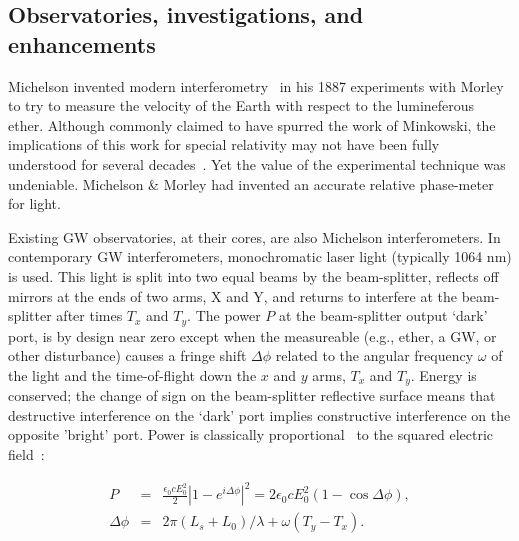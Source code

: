 
        \subsection{Observatories, investigations, and enhancements}
        \label{methods}


	Michelson invented modern interferometry~\cite{michelson} in his 1887 experiments with Morley to try to measure the velocity of the Earth with respect to the lumineferous ether.
Although commonly claimed to have spurred the work of Minkowski, the implications of this work for special relativity may not have been fully understood for several decades~\cite{CollinsGravityGhost}.
Yet the value of the experimental technique was undeniable.
Michelson \& Morley had invented an accurate relative phase-meter for light.

Existing GW observatories, at their cores, are also Michelson interferometers. 
In contemporary GW interferometers, monochromatic laser light (typically 1064 nm) is used.
This light is split into two equal beams by the beam-splitter, reflects off mirrors at the ends of two arms, X and Y, and returns to interfere at the beam-splitter after times $T_x$ and $T_y$.
The power $P$ at the beam-splitter output `dark' port, is by design near zero except when the measureable (e.g., ether, a GW, or other disturbance) causes a fringe shift $\Delta \phi$ related to the angular frequency $\omega$ of the light and the time-of-flight down the $x$ and $y$ arms, $T_x$ and $T_y$. 
Energy is conserved; the change of sign on the beam-splitter reflective surface means that destructive interference on the `dark' port implies constructive interference on the opposite 'bright' port.
Power is classically proportional~\cite{JacksonEM} to the squared electric field~\cite{Saulson}:

\begin{eqnarray}
P &=& \frac{\epsilon_0 c E_0^2}{2} \left| 1 - e^{i \Delta \phi}\right|^2 = 2 \epsilon_0 c E_0^2 (1 - \cos \Delta {\phi}),
\label{michelson-interferometry-eq}\\
\Delta \phi &=& 2\pi (L_s + L_0) /\lambda + \omega (T_y - T_x).
\end{eqnarray}

